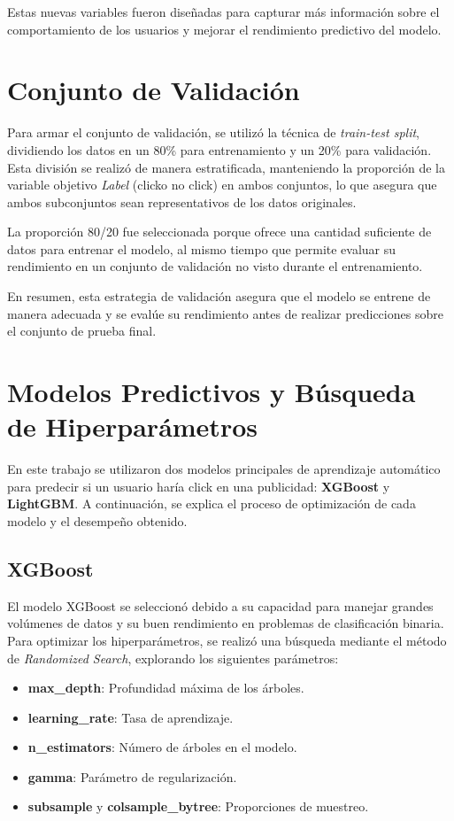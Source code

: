\documentclass[a4paper,11pt]{article}
\begin{document}
Estas nuevas variables fueron diseñadas para capturar más información sobre el comportamiento de los usuarios y mejorar el rendimiento predictivo del modelo.

\section{Conjunto de Validación}

Para armar el conjunto de validación, se utilizó la técnica de \textit{train-test split}, dividiendo los datos en un 80\% para entrenamiento y un 20\% para validación. Esta división se realizó de manera estratificada, manteniendo la proporción de la variable objetivo \textit{Label} (clicko no click) en ambos conjuntos, lo que asegura que ambos subconjuntos sean representativos de los datos originales.

La proporción 80/20 fue seleccionada porque ofrece una cantidad suficiente de datos para entrenar el modelo, al mismo tiempo que permite evaluar su rendimiento en un conjunto de validación no visto durante el entrenamiento.

En resumen, esta estrategia de validación asegura que el modelo se entrene de manera adecuada y se evalúe su rendimiento antes de realizar predicciones sobre el conjunto de prueba final.


\section{Modelos Predictivos y Búsqueda de Hiperparámetros}

En este trabajo se utilizaron dos modelos principales de aprendizaje automático para predecir si un usuario haría click en una publicidad: \textbf{XGBoost} y \textbf{LightGBM}. A continuación, se explica el proceso de optimización de cada modelo y el desempeño obtenido.

\subsection{XGBoost}

El modelo XGBoost se seleccionó debido a su capacidad para manejar grandes volúmenes de datos y su buen rendimiento en problemas de clasificación binaria. Para optimizar los hiperparámetros, se realizó una búsqueda mediante el método de \textit{Randomized Search}, explorando los siguientes parámetros:

\begin{itemize}
    \item \textbf{max\_depth}: Profundidad máxima de los árboles.
    \item \textbf{learning\_rate}: Tasa de aprendizaje.
    \item \textbf{n\_estimators}: Número de árboles en el modelo.
    \item \textbf{gamma}: Parámetro de regularización.
    \item \textbf{subsample} y \textbf{colsample\_bytree}: Proporciones de muestreo.
\end{itemize}
\end{document}
